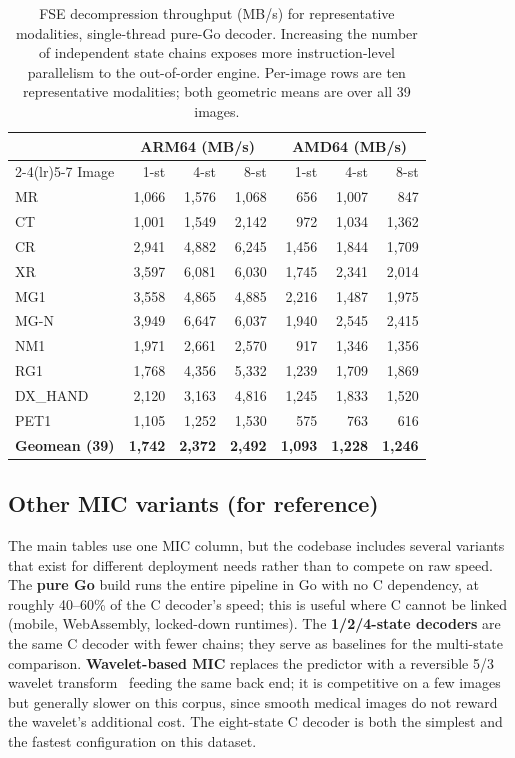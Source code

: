 \documentclass[journal]{IEEEtran}
\begin{document}
\begin{table}[htbp]
\centering
\caption{FSE decompression throughput (MB/s) for representative modalities,
single-thread pure-Go decoder. Increasing the number of independent state
chains exposes more instruction-level parallelism to the out-of-order
engine. Per-image rows are ten representative modalities; both geometric
means are over all 39 images.}
\label{tab:fse-combined}
\scriptsize
\setlength{\tabcolsep}{4pt}
\begin{tabular}{lrrrrrr}
\toprule
 & \multicolumn{3}{c}{ARM64 (MB/s)} & \multicolumn{3}{c}{AMD64 (MB/s)} \\
\cmidrule(lr){2-4}\cmidrule(lr){5-7}
Image & 1-st & 4-st & 8-st & 1-st & 4-st & 8-st \\
\midrule
MR       & 1,066 & 1,576 & 1,068 &   656 & 1,007 &   847 \\
CT       & 1,001 & 1,549 & 2,142 &   972 & 1,034 & 1,362 \\
CR       & 2,941 & 4,882 & 6,245 & 1,456 & 1,844 & 1,709 \\
XR       & 3,597 & 6,081 & 6,030 & 1,745 & 2,341 & 2,014 \\
MG1      & 3,558 & 4,865 & 4,885 & 2,216 & 1,487 & 1,975 \\
MG-N     & 3,949 & 6,647 & 6,037 & 1,940 & 2,545 & 2,415 \\
NM1      & 1,971 & 2,661 & 2,570 &   917 & 1,346 & 1,356 \\
RG1      & 1,768 & 4,356 & 5,332 & 1,239 & 1,709 & 1,869 \\
DX\_HAND & 2,120 & 3,163 & 4,816 & 1,245 & 1,833 & 1,520 \\
PET1     & 1,105 & 1,252 & 1,530 &   575 &   763 &   616 \\
\midrule
\textbf{Geomean (39)} & \textbf{1,742} & \textbf{2,372} & \textbf{2,492} &
\textbf{1,093} & \textbf{1,228} & \textbf{1,246} \\
\bottomrule
\end{tabular}
\end{table}

\subsection{Other MIC variants (for reference)}

The main tables use one MIC column, but the codebase includes several variants
that exist for different deployment needs rather than to compete on raw speed.
The \textbf{pure Go} build runs the entire pipeline in Go with no C dependency,
at roughly 40--60\% of the C decoder's speed; this is useful where C cannot be
linked (mobile, WebAssembly, locked-down runtimes). The
\textbf{1/2/4-state decoders} are the same C decoder with fewer chains; they
serve as baselines for the multi-state comparison. \textbf{Wavelet-based MIC}
replaces the predictor with a reversible 5/3 wavelet transform~\cite{legall1988}
feeding the same back end; it is competitive on a few images but generally
slower on this corpus, since smooth medical images do not reward the wavelet's
additional cost. The eight-state C decoder is both the simplest and the fastest
configuration on this dataset.
\end{document}
